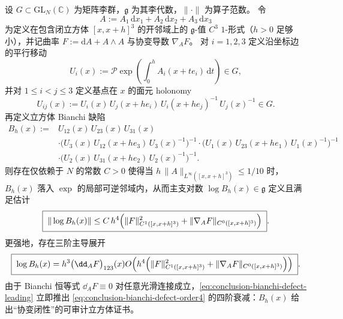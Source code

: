 \begin{theorem}\label{thm:conclusion-nonabelian-stokes-bianchi-cube-certificate}
设 \(G\subset \mathrm{GL}_N(\mathbb C)\) 为矩阵李群，\(\mathfrak g\) 为其李代数，\(\|\cdot\|\) 为算子范数。
令
\[
A:=A_1\,\mathrm d x_1+A_2\,\mathrm d x_2+A_3\,\mathrm d x_3
\]
为定义在包含闭立方体 \([x,x+h]^3\) 的开邻域上的 \(\mathfrak g\)-值 \(C^3\) \(1\)-形式（\(h>0\) 足够小），并记曲率 \(F:=\mathrm d A+A\wedge A\) 与协变导数 \(\nabla_A F\)。
对 \(i=1,2,3\) 定义沿坐标边的平行移动
\[
U_i(x):=\mathcal P\exp\!\left(\int_0^h A_i(x+t e_i)\,\mathrm d t\right)\in G,
\]
并对 \(1\le i<j\le 3\) 定义基点在 \(x\) 的面元 holonomy
\[
U_{ij}(x):=U_i(x)\,U_j(x+h e_i)\,U_i(x+h e_j)^{-1}\,U_j(x)^{-1}\in G.
\]
再定义立方体 Bianchi 缺陷
\begin{equation}\label{eq:conclusion-bianchi-defect-cube}
\begin{aligned}
B_h(x):={}&U_{12}(x)\,U_{23}(x)\,U_{31}(x)\\
&\cdot\bigl(U_3(x)\,U_{12}(x+h e_3)\,U_3(x)^{-1}\bigr)^{-1}
\cdot\bigl(U_1(x)\,U_{23}(x+h e_1)\,U_1(x)^{-1}\bigr)^{-1}\\
&\cdot\bigl(U_2(x)\,U_{31}(x+h e_2)\,U_2(x)^{-1}\bigr)^{-1}.
\end{aligned}
\end{equation}
则存在仅依赖于 \(N\) 的常数 \(C>0\) 使得当 \(h\,\|A\|_{L^\infty([x,x+h]^3)}\le 1/10\) 时，\(B_h(x)\) 落入 \(\exp\) 的局部可逆邻域内，从而主支对数 \(\log B_h(x)\in\mathfrak g\) 定义且满足估计
\begin{equation}\label{eq:conclusion-bianchi-defect-order4}
\boxed{\;
\|\log B_h(x)\|
\le
C\,h^4\Bigl(\|F\|_{C^1([x,x+h]^3)}^{2}+\|\nabla_A F\|_{C^0([x,x+h]^3)}\Bigr)\; }.
\end{equation}
更强地，存在三阶主导展开
\begin{equation}\label{eq:conclusion-bianchi-defect-leading}
\boxed{\;
\log B_h(x)
=h^3\bigl(\dd_A F\bigr)_{123}(x)
O\!\left(h^4\Bigl(\|F\|_{C^1([x,x+h]^3)}^{2}+\|\nabla_A F\|_{C^0([x,x+h]^3)}\Bigr)\right)\; }.
\end{equation}
由于 Bianchi 恒等式 \(\dd_A F\equiv 0\) 对任意光滑连接成立，\eqref{eq:conclusion-bianchi-defect-leading} 立即推出 \eqref{eq:conclusion-bianchi-defect-order4} 的四阶衰减：\(B_h(x)\) 给出“协变闭性”的可审计立方体证书。
\end{theorem}
